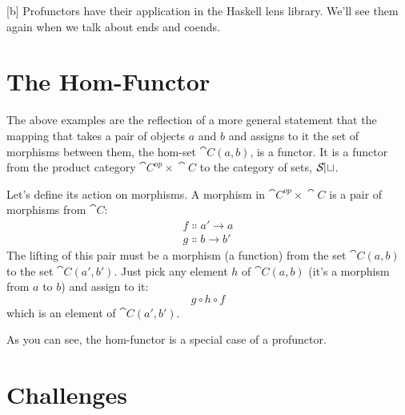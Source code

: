 [b]
Profunctors have their application in the Haskell lens library. We'll
see them again when we talk about ends and coends.

\section{The Hom-Functor}

The above examples are the reflection of a more general statement that
the mapping that takes a pair of objects $a$ and $b$ and
assigns to it the set of morphisms between them, the hom-set
$\cat{C}(a, b)$, is a functor. It is a functor from the product
category $\cat{C}^{op}\times{}\cat{C}$ to the category of sets, $\mathcal{S\mkern-3mu et}$.

Let's define its action on morphisms. A morphism in
$\cat{C}^{op}\times{}\cat{C}$ is a pair of morphisms from $\cat{C}$:
\begin{gather*}
f \Colon a' \to a \\
g \Colon b \to b'
\end{gather*}
The lifting of this pair must be a morphism (a function) from the set
$\cat{C}(a, b)$ to the set $\cat{C}(a', b')$. Just pick
any element $h$ of $\cat{C}(a, b)$ (it's a morphism from
$a$ to $b$) and assign to it:
\[g \circ h \circ f\]
which is an element of $\cat{C}(a', b')$.

As you can see, the hom-functor is a special case of a profunctor.

\section{Challenges}

